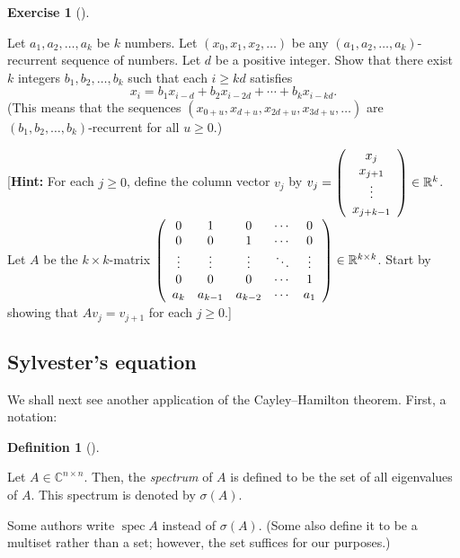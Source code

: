 \documentclass[numbers=enddot,12pt,final,onecolumn,notitlepage]{scrartcl}%
\newcounter{exer}
\numberwithin{exer}{subsection}
\theoremstyle{definition}
\newtheorem{defi}[theo]{Definition}
\newenvironment{definition}[1][]
{\begin{defi}[#1]\begin{leftbar}}
{\end{leftbar}\end{defi}}
\newtheorem{exmp}[exer]{Exercise}
\newenvironment{exercise}[1][]
{\begin{exmp}[#1]\begin{leftbar}}
{\end{leftbar}\end{exmp}}
\begin{document}
\begin{exercise}
\label{exe.schurtri.ch.lin-rec-kd} Let $a_{1},a_{2},\ldots,a_{k}$ be
$k$ numbers. Let $\left(  x_{0},x_{1},x_{2},\ldots\right)  $ be any $\left(
a_{1},a_{2},\ldots,a_{k}\right)  $-recurrent sequence of numbers. Let $d$ be a
positive integer. Show that there exist $k$ integers $b_{1},b_{2},\ldots
,b_{k}$ such that each $i\geq kd$ satisfies%
\[
x_{i}=b_{1}x_{i-d}+b_{2}x_{i-2d}+\cdots+b_{k}x_{i-kd}.
\]
(This means that the sequences $\left(  x_{0+u},x_{d+u},x_{2d+u}%
,x_{3d+u},\ldots\right)  $ are $\left(  b_{1},b_{2},\ldots,b_{k}\right)
$-recurrent for all $u\geq0$.)

[\textbf{Hint:} For each $j\geq0$, define the column vector $v_{j}$ by
$v_{j}=\left(
\begin{array}
[c]{c}%
x_{j}\\
x_{j+1}\\
\vdots\\
x_{j+k-1}%
\end{array}
\right)  \in\mathbb{R}^{k}$. Let $A$ be the $k\times k$-matrix $\left(
\begin{array}
[c]{ccccc}%
0 & 1 & 0 & \cdots & 0\\
0 & 0 & 1 & \cdots & 0\\
\vdots & \vdots & \vdots & \ddots & \vdots\\
0 & 0 & 0 & \cdots & 1\\
a_{k} & a_{k-1} & a_{k-2} & \cdots & a_{1}%
\end{array}
\right)  \in\mathbb{R}^{k\times k}$. Start by showing that $Av_{j}=v_{j+1}$
for each $j\geq0$.]
\end{exercise}

\subsection{Sylvester's equation}

We shall next see another application of the Cayley--Hamilton theorem. First,
a notation:

\begin{definition}
\label{def.schurtri.syl.spec}Let $A\in\mathbb{C}^{n\times n}$. Then, the
\emph{spectrum} of $A$ is defined to be the set of all eigenvalues of $A$.
This spectrum is denoted by $\sigma\left(  A\right)  $.
\end{definition}

Some authors write $\operatorname*{spec}A$ instead of $\sigma\left(  A\right)
$. (Some also define it to be a multiset rather than a set; however, the set
suffices for our purposes.)
\end{document}
